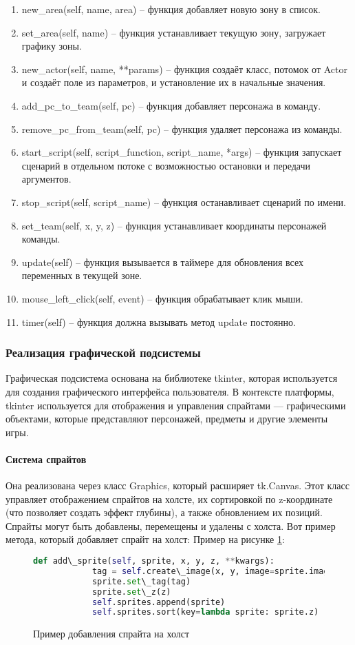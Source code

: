 		\begin{enumerate}
			\item new\_area(self, name, area) -- функция добавляет новую зону в список.
			\item set\_area(self, name) -- функция устанавливает текущую зону, загружает графику зоны.
			\item new\_actor(self, name, **params) -- функция создаёт класс, потомок от Actor и создаёт поле из параметров, и установление их в начальные значения.
			\item add\_pc\_to\_team(self, pc) -- функция добавляет персонажа в команду.
			\item remove\_pc\_from\_team(self, pc) -- функция удаляет персонажа из команды.
			\item start\_script(self, script\_function, script\_name, *args) -- функция запускает сценарий в отдельном потоке с возможностью остановки и передачи аргументов.
			\item stop\_script(self, script\_name) -- функция останавливает сценарий по имени.
			\item set\_team(self, x, y, z) -- функция устанавливает координаты персонажей команды.
			\item update(self) -- функция вызывается в таймере для обновления всех переменных в текущей зоне.
			\item mouse\_left\_click(self, event) -- функция обрабатывает клик мыши.
			\item timer(self) -- функция должна вызывать метод update постоянно.
		\end{enumerate}

\subsubsection{Реализация графической подсистемы}
Графическая подсистема основана на библиотеке tkinter, которая используется для создания графического интерфейса пользователя. В контексте платформы, tkinter используется для отображения и управления спрайтами — графическими объектами, которые представляют персонажей, предметы и другие элементы игры.
\paragraph{Система спрайтов}
Она реализована через класс Graphics, который расширяет tk.Canvas. Этот класс управляет отображением спрайтов на холсте, их сортировкой по z-координате (что позволяет создать эффект глубины), а также обновлением их позиций. Спрайты могут быть добавлены, перемещены и удалены с холста. Вот пример метода, который добавляет спрайт на холст:
Пример на рисунке \ref{ttk:image}:
\begin{figure}[H]
	\begin{lstlisting}[language=Python]
		def add\_sprite(self, sprite, x, y, z, **kwargs):
			tag = self.create\_image(x, y, image=sprite.image, anchor='center', **kwargs)
			sprite.set\_tag(tag)
			sprite.set\_z(z)
			self.sprites.append(sprite)
			self.sprites.sort(key=lambda sprite: sprite.z)
\end{lstlisting}  
\caption{Пример добавления спрайта на холст}
\label{ttk:image}
\end{figure}
